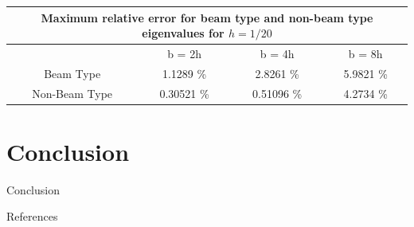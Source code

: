 \documentclass[8pt]{beamer}
\begin{document}
    \begin{frame}
        \begin{table}[htbp]
            \centering
            \begin{tabular}{|c|ccc|}
                \hline
                \multicolumn{4}{|c|}{Maximum relative error for beam type and non-beam type eigenvalues for $h = 1/20$} \\
                \hline
                \hline
                & {b = 2h} & {b = 4h} & {b = 8h} \\
                \hline
                Beam Type & 1.1289 \% & 2.8261 \% & 5.9821 \% \\
                Non-Beam Type & 0.30521 \% & 0.51096 \% & 4.2734 \% \\
                \hline
            \end{tabular}%
            \label{tab:b>h-split_20}%
        \end{table}%
    \end{frame}

\section{Conclusion}
    \begin{frame}{Conclusion}
    \end{frame}

    \begin{frame}{References}
        \printbibliography[heading=bibintoc, title={References}]
    \end{frame}
\end{document}
